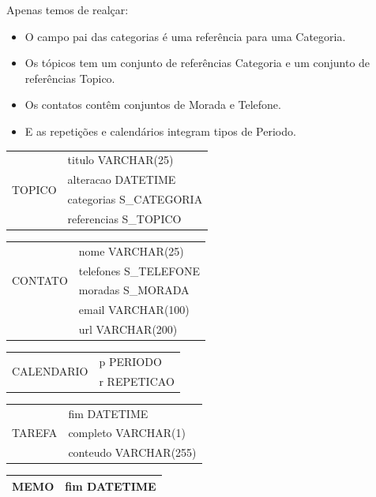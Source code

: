 \documentclass[a4paper,12pt]{article}
\begin{document}
	Apenas temos de realçar:

	\begin{itemize}
		\item O campo pai das categorias é uma referência para uma Categoria.
		\item Os tópicos tem um conjunto de referências Categoria e um conjunto de referências Topico.
		\item Os contatos contêm conjuntos de Morada e Telefone.
		\item	E as repetições e calendários integram tipos de Periodo. 
	\end{itemize}

	\begin{multicols}{2}

		\begin{tabular}{|c|l|} \hline
			\multirow{4}{*}{TOPICO}
			& titulo VARCHAR(25) \\
			& alteracao DATETIME \\ 
			& categorias S\_CATEGORIA \\
			& referencias S\_TOPICO\\ \hline 
		\end{tabular}
		
		\begin{tabular}{|c|l|} \hline
			\multirow{4}{*}{CONTATO}
			& nome VARCHAR(25) \\
			& telefones S\_TELEFONE \\ 
			& moradas S\_MORADA \\
			& email VARCHAR(100) \\ 
			& url VARCHAR(200) \\ \hline 
		\end{tabular}
		
		\begin{tabular}{|c|l|} \hline
			\multirow{2}{*}{CALENDARIO}
			& p PERIODO \\
			& r REPETICAO \\ \hline 
		\end{tabular}
		
		\begin{tabular}{|c|l|} \hline
			\multirow{3}{*}{TAREFA}
			& fim DATETIME \\
			& completo VARCHAR(1) \\ 
			& conteudo VARCHAR(255) \\ \hline 
		\end{tabular}
		
		\begin{tabular}{|c|l|} \hline
			MEMO & fim DATETIME \\ \hline
		\end{tabular}
		

\end{multicols}
\end{document}
